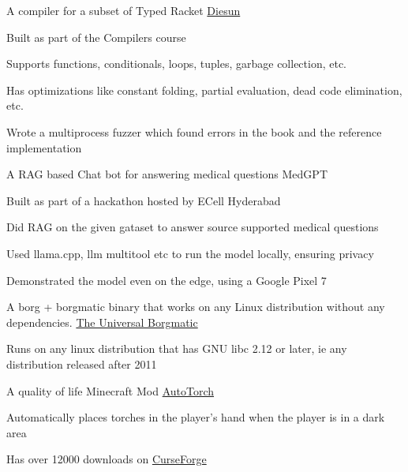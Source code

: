 
\begin{cventries}
	\cventry
    {A compiler for a subset of Typed Racket} %
    {\href{https://github.com/necessary129/diesun}{Diesun}} %
    {} %
    {} %
    {
      \begin{cvitems} %
		\item {Built as part of the Compilers course}
		\item {Supports functions, conditionals, loops, tuples, garbage collection, etc.}
		\item {Has optimizations like constant folding, partial evaluation, dead code elimination, etc.}
		\item {Wrote a multiprocess fuzzer which found errors in the book and the reference implementation}
      \end{cvitems}
    }

	\cventry
    {A RAG based Chat bot for answering medical questions} %
    {MedGPT} %
    {} %
    {} %
    {
      \begin{cvitems} %
		\item {Built as part of a hackathon hosted by ECell Hyderabad}
		\item {Did RAG on the given gataset to answer source supported medical questions}
		\item {Used llama.cpp, llm multitool etc to run the model locally, ensuring privacy}
		\item {Demonstrated the model even on the edge, using a Google Pixel 7}
      \end{cvitems}
    }

	\cventry
    {A borg + borgmatic binary that works on any Linux distribution without any dependencies.} %
    {\href{https://github.com/necessary129/the-universal-borgmatic}{The Universal Borgmatic}} %
    {} %
    {} %
    {
      \begin{cvitems} %
		\item {Runs on any linux distribution that has GNU libc 2.12 or later, ie any distribution released after 2011}
      \end{cvitems}
    }

	\cventry
    {A quality of life Minecraft Mod} %
    {\href{https://www.curseforge.com/minecraft/mc-mods/auto-torch}{AutoTorch}} %
    {} %
    {} %
    {
      \begin{cvitems} %
        \item {Automatically places torches in the player's hand when the player is in a dark area}
        \item {Has over 12000 downloads on \href{https://www.curseforge.com/minecraft/mc-mods/auto-torch}{CurseForge}}
	\end{cvitems}
    }
	

\end{cventries}
